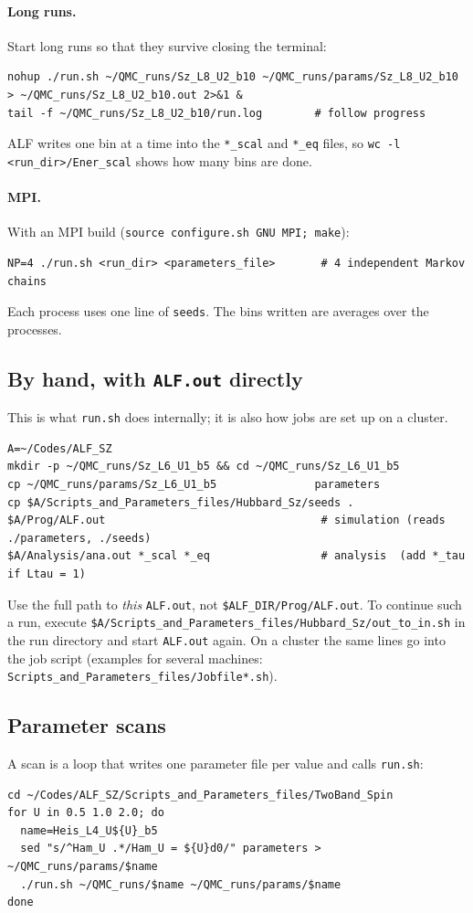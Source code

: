 \documentclass[11pt,a4paper]{article}
\newcommand{\f}[1]{\texttt{#1}}          %
\begin{document}
\paragraph{Long runs.}
Start long runs so that they survive closing the terminal:
\begin{lstlisting}
nohup ./run.sh ~/QMC_runs/Sz_L8_U2_b10 ~/QMC_runs/params/Sz_L8_U2_b10 > ~/QMC_runs/Sz_L8_U2_b10.out 2>&1 &
tail -f ~/QMC_runs/Sz_L8_U2_b10/run.log        # follow progress
\end{lstlisting}
ALF writes one bin at a time into the \f{*\_scal} and \f{*\_eq} files, so \f{wc -l
<run\_dir>/Ener\_scal} shows how many bins are done.

\paragraph{MPI.}
With an MPI build (\f{source configure.sh GNU MPI; make}):
\begin{lstlisting}
NP=4 ./run.sh <run_dir> <parameters_file>       # 4 independent Markov chains
\end{lstlisting}
Each process uses one line of \f{seeds}. The bins written are averages over the
processes.

\subsection{By hand, with \texorpdfstring{\texttt{ALF.out}}{ALF.out} directly}
This is what \f{run.sh} does internally; it is also how jobs are set up on a cluster.
\begin{lstlisting}
A=~/Codes/ALF_SZ
mkdir -p ~/QMC_runs/Sz_L6_U1_b5 && cd ~/QMC_runs/Sz_L6_U1_b5
cp ~/QMC_runs/params/Sz_L6_U1_b5               parameters
cp $A/Scripts_and_Parameters_files/Hubbard_Sz/seeds .
$A/Prog/ALF.out                                 # simulation (reads ./parameters, ./seeds)
$A/Analysis/ana.out *_scal *_eq                 # analysis  (add *_tau if Ltau = 1)
\end{lstlisting}
Use the full path to \emph{this} \f{ALF.out}, not \f{\$ALF\_DIR/Prog/ALF.out}. To continue
such a run, execute \f{\$A/Scripts\_and\_Parameters\_files/Hubbard\_Sz/out\_to\_in.sh} in the
run directory and start \f{ALF.out} again. On a cluster the same lines go into the job
script (examples for several machines: \f{Scripts\_and\_Parameters\_files/Jobfile*.sh}).

\subsection{Parameter scans}
A scan is a loop that writes one parameter file per value and calls \f{run.sh}:
\begin{lstlisting}
cd ~/Codes/ALF_SZ/Scripts_and_Parameters_files/TwoBand_Spin
for U in 0.5 1.0 2.0; do
  name=Heis_L4_U${U}_b5
  sed "s/^Ham_U .*/Ham_U = ${U}d0/" parameters > ~/QMC_runs/params/$name
  ./run.sh ~/QMC_runs/$name ~/QMC_runs/params/$name
done
\end{lstlisting}
\end{document}
